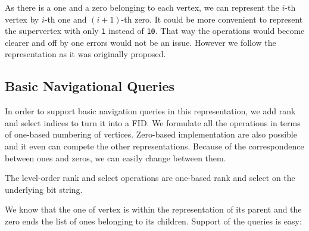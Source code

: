 As there is a one and a zero belonging to each vertex, we can represent the $i$-th vertex by $i$-th one and $(i+1)$-th zero.
It could be more convenient to represent the supervertex with only \verb|1| instead of \verb|10|.
That way the operations would become clearer and off by one errors would not be an issue.
However we follow the representation as it was originally proposed.

\subsection{Basic Navigational Queries}

In order to support basic navigation queries in this representation, we add rank and select indices to turn it into a FID.
We formulate all the operations in terms of one-based numbering of vertices.
Zero-based implementation are also possible  and it even can compete the other representations.
Because of the correspondence between ones and zeros, we can easily change between them.

\begin{algorithmic}
	\State {}
\EndFunction
\end{algorithmic}

\begin{algorithmic}
	\State {}
\EndFunction
\end{algorithmic}

The level-order rank and select operations are one-based rank and select on the underlying bit string.

We know that the one of vertex is within the representation of its parent and the zero ends the list of ones belonging to its children.
Support of the queries is easy:

\begin{algorithmic}
	\State {}
\EndFunction
\end{algorithmic}

\begin{algorithmic}
	\State {} 
\EndFunction
\end{algorithmic}

\begin{algorithmic}
		\State {}
	\Else
		\State {} 
	\EndIf
\EndFunction
\end{algorithmic}

